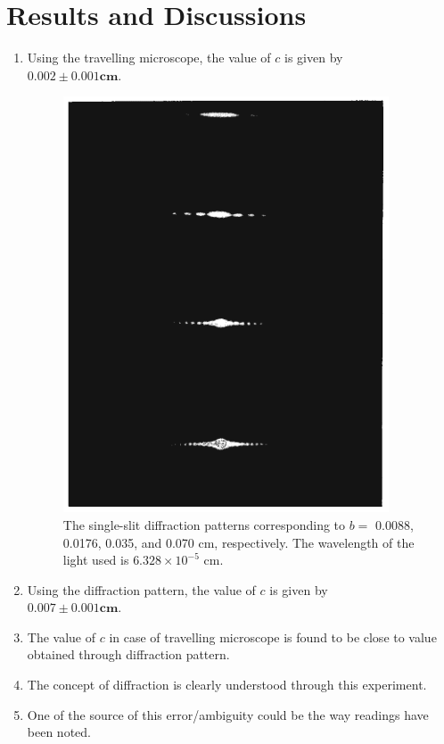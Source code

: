 \documentclass{article}
\begin{document}
\section{Results and Discussions}
\begin{enumerate}
    \item Using the travelling microscope, the value of $c$ is given by \\$\mathbf{0.002 \pm 0.001 cm}$.
        \begin{figure}[h!]
            \centering
            \includegraphics[scale = 0.4]{Figures/snglslitpattern.png}
            \caption{The single-slit diffraction patterns corresponding to $b =$ 0.0088, 0.0176, 0.035, and 0.070 cm, respectively. The wavelength of the light used is $6.328 \times 10^{-5}$ cm.}
            \label{fig:snglpattern}
        \end{figure}
    \item Using the diffraction pattern, the value of $c$ is given by \\$\mathbf{0.007 \pm 0.001 cm}$.
    \item The value of $c$ in case of travelling microscope is found to be close to value obtained through diffraction pattern.
    \item The concept of diffraction is clearly understood through this experiment.
    \item One of the source of this error/ambiguity could be the way readings have been noted.

\end{enumerate}
\end{document}
